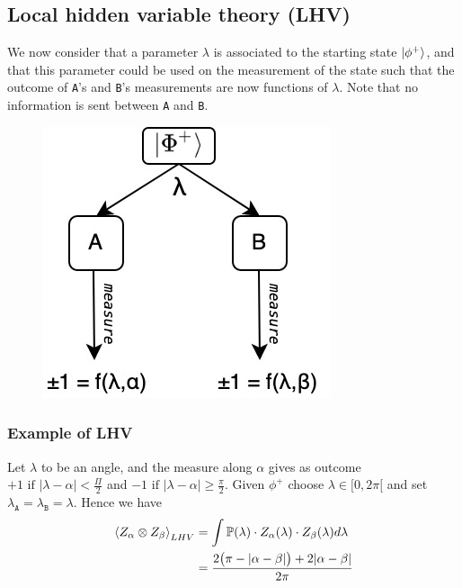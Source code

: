 \documentclass{article}
\begin{document}
\subsection{Local hidden variable theory (LHV)}
We now consider that a parameter $\lambda$ is associated to the starting state
$\ket{\phi^+}$, and that this parameter could be used on the measurement of the
state such that the outcome of \texttt{A}'s and \texttt{B}'s measurements are now
functions of $\lambda$. Note that no information is sent between \texttt{A} and \texttt{B}.

\begin{figure}[h]
    \centering
    \includegraphics[scale=0.4]{bell-ineq-sharing-scheme-lhv.jpeg}
    \caption{}
\end{figure}
\subsubsection*{Example of LHV}
Let $\lambda$ to be an angle, and the measure along $\alpha$ gives as outcome
$+1 \text{ if } |\lambda - \alpha | < \frac{\Pi}{2}$ and $-1 \text{ if }
|\lambda - \alpha | \geq \frac{\pi}{2}$.
Given $\phi^+$ choose $ \lambda \in [0, 2\pi[$ and set
$\lambda_\texttt{A} = \lambda_\texttt{B} = \lambda$.
Hence we have
\begin{equation}
    \begin{aligned}
        \braket{Z_\alpha \otimes Z_\beta}_{LHV}
            & = \int\mathbb{P}(\lambda) \cdot Z_\alpha(\lambda) \cdot Z_\beta(\lambda) d\lambda \\
            & = \frac{2\big(\pi - |\alpha - \beta|\big) + 2|\alpha-\beta|}{2\pi}
    \end{aligned}
\end{equation}

\end{document}
